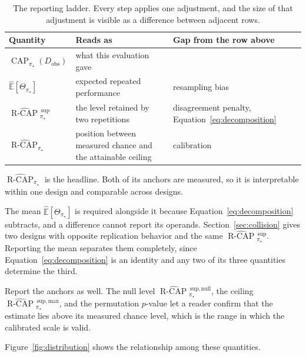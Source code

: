 \documentclass[11pt]{article}
\newcommand{\CAP}{\operatorname{CAP}}
\newcommand{\Tpi}{\CAP_{\pi_\star}}
\newcommand{\E}{\mathbb{E}}
\newcommand{\RCAPHat}{\widehat{\operatorname{R\text{-}CAP}}{}^{\,\mathrm{sup}}_{\pi_\star}}
\newcommand{\RCAPnullHat}{\widehat{\operatorname{R\text{-}CAP}}{}^{\,\mathrm{sup,null}}_{\pi_\star}}
\newcommand{\RCAPcalHat}{\widehat{\operatorname{R\text{-}CAP}}_{\pi_\star}}
\newcommand{\RCAPmaxHat}{\widehat{\operatorname{R\text{-}CAP}}{}^{\,\mathrm{sup,max}}_{\pi_\star}}
\theoremstyle{remark}
\begin{document}
\begin{table}[ht]
\centering
\caption{The reporting ladder. Every step applies one adjustment, and the size of that adjustment is visible as a difference between adjacent rows.}
\label{tab:ladder}
\begin{tabularx}{\textwidth}{@{}>{\raggedright\arraybackslash}p{}>{\raggedright\arraybackslash}X>{\raggedright\arraybackslash}p{}@{}}
\toprule
Quantity & Reads as & Gap from the row above \\
\midrule
$\Tpi(D_{\mathrm{obs}})$ & what this evaluation gave & \\
$\widehat{\E}[\Theta_{\pi_\star}]$ & expected repeated performance & resampling bias \\
$\RCAPHat$ & the level retained by two repetitions & disagreement penalty, Equation~\eqref{eq:decomposition} \\
$\RCAPcalHat$ & position between measured chance and the attainable ceiling & calibration \\
\bottomrule
\end{tabularx}
\end{table}

$\RCAPcalHat$ is the headline. Both of its anchors are measured, so it is interpretable within one design and comparable across designs.

The mean $\widehat{\E}[\Theta_{\pi_\star}]$ is required alongside it because Equation~\eqref{eq:decomposition} subtracts, and a difference cannot report its operands. Section~\ref{sec:collision} gives two designs with opposite replication behavior and the same $\RCAPHat$. Reporting the mean separates them completely, since Equation~\eqref{eq:decomposition} is an identity and any two of its three quantities determine the third.

Report the anchors as well. The null level $\RCAPnullHat$, the ceiling $\RCAPmaxHat$, and the permutation $p$-value let a reader confirm that the estimate lies above its measured chance level, which is the range in which the calibrated scale is valid.

Figure~\ref{fig:distribution} shows the relationship among these quantities.
\end{document}
